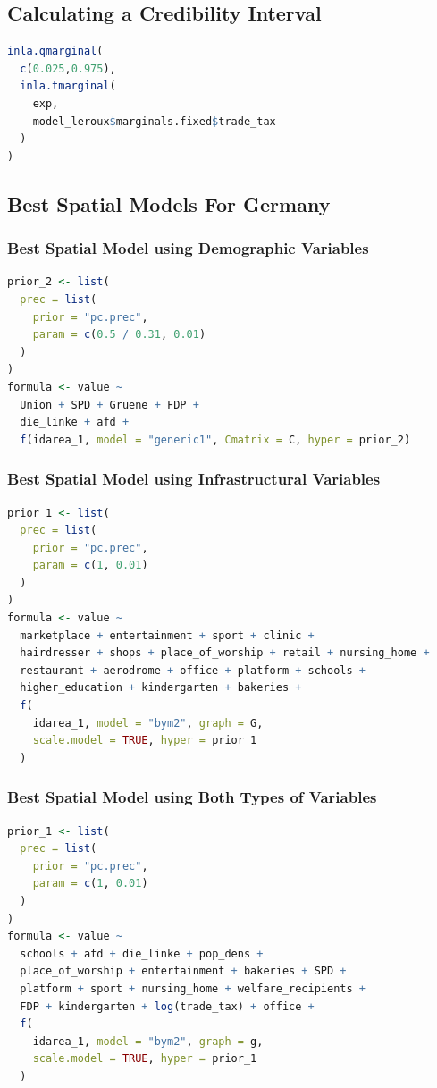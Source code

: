 \subsection{Calculating a Credibility Interval}
\begin{lstlisting}[caption={Extracting the credibility interval for a coefficient}, label={codeCredibility}, language=R]
inla.qmarginal(
  c(0.025,0.975),
  inla.tmarginal(
    exp,
    model_leroux$marginals.fixed$trade_tax
  )
)
\end{lstlisting}
\subsection{Best Spatial Models For Germany}
\subsubsection{Best Spatial Model using Demographic Variables}
\begin{lstlisting}[caption={The code for the demographic model.}, label={codeDemoGermany}, language=R]
prior_2 <- list(
  prec = list(
    prior = "pc.prec",
    param = c(0.5 / 0.31, 0.01)
  )
)
formula <- value ~
  Union + SPD + Gruene + FDP +
  die_linke + afd + 
  f(idarea_1, model = "generic1", Cmatrix = C, hyper = prior_2)
\end{lstlisting}
\subsubsection{Best Spatial Model using Infrastructural Variables}
\begin{lstlisting}[caption={The code for the infrastructure model.}, label={codeInfraGermany}, language=R]
prior_1 <- list(
  prec = list(
    prior = "pc.prec",
    param = c(1, 0.01)
  )
)
formula <- value ~
  marketplace + entertainment + sport + clinic +
  hairdresser + shops + place_of_worship + retail + nursing_home +
  restaurant + aerodrome + office + platform + schools +
  higher_education + kindergarten + bakeries + 
  f(
    idarea_1, model = "bym2", graph = G,
    scale.model = TRUE, hyper = prior_1
  )
\end{lstlisting}
\subsubsection{Best Spatial Model using Both Types of Variables}
\begin{lstlisting}[caption={The code for the demographic + infrastructure model.}, label={codeBothGermany}, language=R]
prior_1 <- list(
  prec = list(
    prior = "pc.prec",
    param = c(1, 0.01)
  )
)
formula <- value ~
  schools + afd + die_linke + pop_dens +
  place_of_worship + entertainment + bakeries + SPD +
  platform + sport + nursing_home + welfare_recipients +
  FDP + kindergarten + log(trade_tax) + office +
  f(
    idarea_1, model = "bym2", graph = g,
    scale.model = TRUE, hyper = prior_1
  )
\end{lstlisting}
